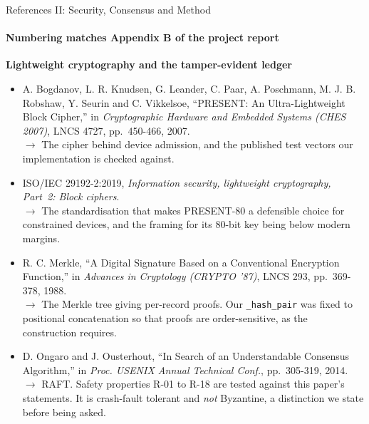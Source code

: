 \documentclass[aspectratio=169, 11pt]{beamer}
\begin{document}
\begin{frame}[allowframebreaks]{References II: Security, Consensus and Method}
    \framesubtitle{Numbering matches Appendix B of the project report}
    \scriptsize

    \textbf{Lightweight cryptography and the tamper-evident ledger}
    \begin{itemize}\itemsep1.5pt
        \item[{[5]}] A. Bogdanov, L. R. Knudsen, G. Leander, C. Paar, A. Poschmann, M. J. B. Robshaw, Y. Seurin and C. Vikkelsoe, ``PRESENT: An Ultra-Lightweight Block Cipher,'' in \emph{Cryptographic Hardware and Embedded Systems (CHES 2007)}, LNCS 4727, pp.~450-466, 2007.\\
          {\color{gray}$\rightarrow$ The cipher behind device admission, and the published test vectors our implementation is checked against.}
        \item[{[18]}] ISO/IEC 29192-2:2019, \emph{Information security, lightweight cryptography, Part~2: Block ciphers}.\\
          {\color{gray}$\rightarrow$ The standardisation that makes PRESENT-80 a defensible choice for constrained devices, and the framing for its 80-bit key being below modern margins.}
        \item[{[6]}] R. C. Merkle, ``A Digital Signature Based on a Conventional Encryption Function,'' in \emph{Advances in Cryptology (CRYPTO '87)}, LNCS 293, pp.~369-378, 1988.\\
          {\color{gray}$\rightarrow$ The Merkle tree giving per-record proofs. Our \texttt{\_hash\_pair} was fixed to positional concatenation so that proofs are order-sensitive, as the construction requires.}
        \item[{[7]}] D. Ongaro and J. Ousterhout, ``In Search of an Understandable Consensus Algorithm,'' in \emph{Proc. USENIX Annual Technical Conf.}, pp.~305-319, 2014.\\
          {\color{gray}$\rightarrow$ RAFT. Safety properties R-01 to R-18 are tested against this paper's statements. It is crash-fault tolerant and \emph{not} Byzantine, a distinction we state before being asked.}
    \end{itemize}


\end{frame}
\end{document}
